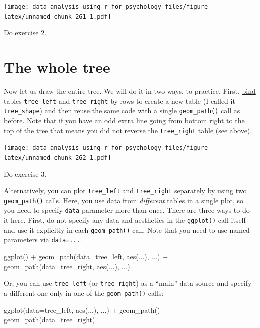 \documentclass[
]{book}
\newenvironment{Shaded}{\begin{snugshade}}{\end{snugshade}}
\newcommand{\AttributeTok}[1]{\textcolor[rgb]{0.77,0.63,0.00}{#1}}
\newcommand{\FunctionTok}[1]{\textcolor[rgb]{0.00,0.00,0.00}{#1}}
\newcommand{\NormalTok}[1]{#1}
\newcommand{\SpecialCharTok}[1]{\textcolor[rgb]{0.00,0.00,0.00}{#1}}
\begin{document}
\texttt{[image: data-analysis-using-r-for-psychology\_files/figure-latex/unnamed-chunk-261-1.pdf]}

Do exercise 2.

\hypertarget{the-whole-tree}{%
\section{The whole tree}\label{the-whole-tree}}

Now let us draw the entire tree. We will do it in two ways, to practice. First, \href{https://dplyr.tidyverse.org/reference/bind.html}{bind} tables \texttt{tree\_left} and \texttt{tree\_right} by rows to create a new table (I called it \texttt{tree\_shape}) and then reuse the same code with a single \texttt{geom\_path()} call as before. Note that if you have an odd extra line going from bottom right to the top of the tree that means you did not reverse the \texttt{tree\_right} table (see above).

\texttt{[image: data-analysis-using-r-for-psychology\_files/figure-latex/unnamed-chunk-262-1.pdf]}

Do exercise 3.

Alternatively, you can plot \texttt{tree\_left} and \texttt{tree\_right} separately by using two \texttt{geom\_path()} calls. Here, you use data from \emph{different} tables in a single plot, so you need to specify \texttt{data} parameter more than once. There are three ways to do it here. First, do not specify any data and aesthetics in the \texttt{ggplot()} call itself and use it explicitly in each \texttt{geom\_path()} call. Note that you need to use named parameters via \texttt{data=...}.

\begin{Shaded}
\begin{Highlighting}[]
\FunctionTok{ggplot}\NormalTok{() }\SpecialCharTok{+} 
  \FunctionTok{geom\_path}\NormalTok{(}\AttributeTok{data=}\NormalTok{tree\_left, }\FunctionTok{aes}\NormalTok{(...), ...) }\SpecialCharTok{+}
  \FunctionTok{geom\_path}\NormalTok{(}\AttributeTok{data=}\NormalTok{tree\_right, }\FunctionTok{aes}\NormalTok{(...), ...)}
\end{Highlighting}
\end{Shaded}

Or, you can use \texttt{tree\_left} (or \texttt{tree\_right}) as a ``main'' data source and specify a different one only in one of the \texttt{geom\_path()} calls:

\begin{Shaded}
\begin{Highlighting}[]
\FunctionTok{ggplot}\NormalTok{(}\AttributeTok{data=}\NormalTok{tree\_left, }\FunctionTok{aes}\NormalTok{(...), ...) }\SpecialCharTok{+} 
  \FunctionTok{geom\_path}\NormalTok{() }\SpecialCharTok{+}
  \FunctionTok{geom\_path}\NormalTok{(}\AttributeTok{data=}\NormalTok{tree\_right)}
\end{Highlighting}
\end{Shaded}
\end{document}
